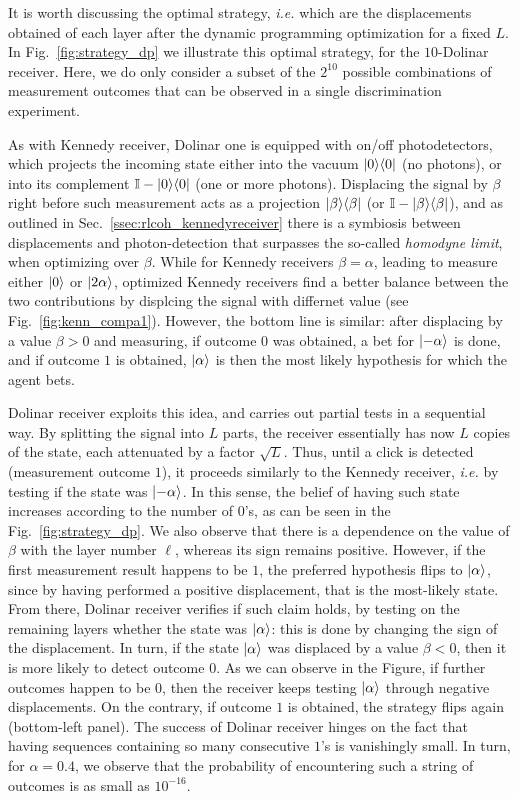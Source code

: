 It is worth discussing the optimal strategy, \textit{i.e.} which are the displacements obtained of each layer after the dynamic programming optimization for a fixed $L$. In Fig.~\ref{fig:strategy_dp} we illustrate this optimal strategy, for the $10$-Dolinar receiver. Here, we do only consider a subset of the $2^{10}$ possible combinations of measurement outcomes that can be observed in a single discrimination experiment.

As with Kennedy receiver, Dolinar one is equipped with on/off photodetectors, which projects the incoming state either into the vacuum $\proj{0}$ (no photons), or into its complement $\mathbb{I} - \proj{0}$ (one or more photons). Displacing the signal by $\beta$ right before such measurement acts as a projection $\proj{\beta}$ (or $\mathbb{I}-\proj{\beta}$), and as outlined in Sec.~\ref{ssec:rlcoh_kennedyreceiver} there is a symbiosis between displacements and photon-detection that surpasses the so-called \textit{homodyne limit}, when optimizing over $\beta$.
While for Kennedy receivers $\beta = \alpha$, leading to measure either $\ket{0}$ or $\ket{2 \alpha}$, optimized Kennedy receivers find a better balance between the two contributions by displcing the signal with differnet value (see Fig.~\ref{fig:kenn_compa1}). However, the bottom line is similar: after displacing by a value $\beta>0$ and measuring, if outcome $0$ was obtained, a bet for $\ket{-\alpha}$ is done, and if outcome $1$ is obtained, $\ket{\alpha}$ is then the most likely hypothesis for which the agent bets.

Dolinar receiver exploits this idea, and carries out partial tests in a sequential way. By splitting the signal into $L$ parts, the receiver essentially has now $L$ copies of the state, each attenuated by a factor $\sqrt{L}$. Thus, until a click is detected (measurement outcome $1$), it proceeds similarly to the Kennedy receiver, \textit{i.e.} by testing if the state was $\ket{-\alpha}$. In this sense, the belief of having such state increases according to the number of $0$'s, as can be seen in the Fig.~\ref{fig:strategy_dp}. We also observe that there is a dependence on the value of $\beta$ with the layer number $\ell$, whereas its sign remains positive. However, if the first measurement result happens to be $1$, the preferred hypothesis flips to $\ket{\alpha}$, since by having performed a positive displacement, that is the most-likely state. From there, Dolinar receiver verifies if such claim holds, by testing on the remaining layers whether the state was $\ket{\alpha}$: this is done by changing the sign of the displacement. In turn, if the state $\ket{\alpha}$
was displaced by a value $\beta<0$, then it is more likely to detect outcome $0$. As we can observe in the Figure, if further outcomes happen to be $0$, then the receiver keeps testing $\ket{\alpha}$ through negative displacements. On the contrary, if outcome $1$ is obtained, the strategy flips again (bottom-left panel). The success of Dolinar receiver hinges on the fact that having sequences containing so many consecutive $1$'s is vanishingly small. In turn, for $\alpha=0.4$, we observe that the probability of encountering such a string of outcomes is as small as $10^{-16}$.

